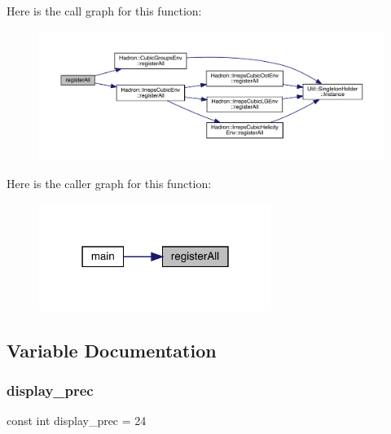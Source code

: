 Here is the call graph for this function\+:
\nopagebreak
\begin{figure}[H]
\begin{center}
\leavevmode
\includegraphics[width=350pt]{d9/d31/adat-devel_2main_2irreputils_2cgs__table__hardcode_8cc_a3872416cf70cb24d7da1008a3f3b1d96_cgraph}
\end{center}
\end{figure}
Here is the caller graph for this function\+:
\nopagebreak
\begin{figure}[H]
\begin{center}
\leavevmode
\includegraphics[width=214pt]{d9/d31/adat-devel_2main_2irreputils_2cgs__table__hardcode_8cc_a3872416cf70cb24d7da1008a3f3b1d96_icgraph}
\end{center}
\end{figure}


\subsection{Variable Documentation}
\mbox{\label{adat-devel_2main_2irreputils_2cgs__table__hardcode_8cc_a473744fa8268c6d49feba30498a6cace}} 
\subsubsection{\texorpdfstring{display\_prec}{display\_prec}}
{\footnotesize\ttfamily const int display\+\_\+prec = 24}

